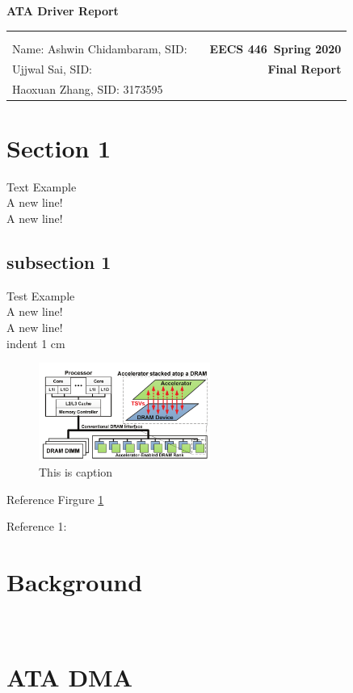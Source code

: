 \documentclass[11pt]{article}
\makeatletter
\newcommand{\course}{EECS 446}
\newcommand{\semester}{Spring 2020}
\newcommand{\hwk}{Final Report}
\newcommand{\reportname}{ATA Driver Report}
\renewcommand\maketitle{
\begin{center}
  {\huge\bf\reportname}\\
\begin{tabular*}{6.44in}{l @{\extracolsep{\fill}}c r}
\bfseries   &   &  \bfseries \\
\bfseries   &   &  \bfseries \\
Name: Ashwin Chidambaram, SID:\bfseries  &  & \bfseries \course ~\semester\\
\-\hspace{1.15cm} Ujjwal Sai, SID: \bfseries&  & \bfseries  \hwk \\
\-\hspace{1.15cm} Haoxuan Zhang, SID: 3173595
\end{tabular*}
\end{center} }
\makeatother
\begin{document}
\maketitle
{}

\section{Section 1 \\}
Text Example \\
A new line!\\

A new line!

\subsection{subsection 1 \\}
Test Example \\
A new line!\\

A new line!\\
\-\hspace{1cm} indent 1 cm

\begin{figure}[h!]
  \center
  \includegraphics[width=0.5\textwidth]{./Figure/NDA.png}
  \caption{This is caption}
  \label{any_name}
\end{figure}

Reference Firgure \ref{any_name}

Reference 1: \cite{Ref1}
\section{Background\\\\}

\section{ATA DMA\\\\}
\end{document}
